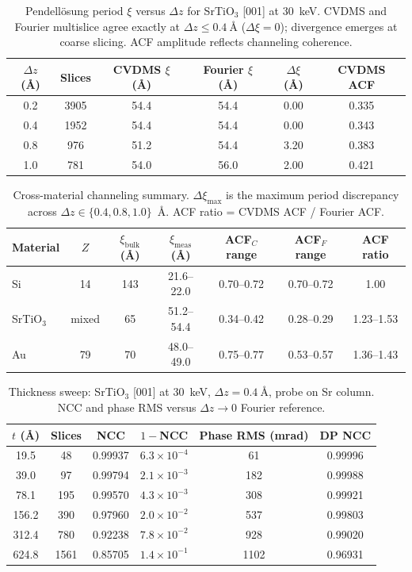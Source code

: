 \documentclass[twoside,11pt]{article}
\begin{document}
\begin{table}[H]
\centering
\caption{Pendell\"osung period $\xi$ versus $\Delta z$ for SrTiO$_3$ [001] at \SI{30}{\keV}. CVDMS and Fourier multislice agree exactly at $\Delta z\le\SI{0.4}{\angstrom}$ ($\Delta\xi=0$); divergence emerges at coarse slicing. ACF amplitude reflects channeling coherence.}
\label{tab:S2}
\small
\begin{tabular}{cccccc}
\toprule
$\Delta z$ (\AA) & Slices & CVDMS $\xi$ (\AA) & Fourier $\xi$ (\AA) & $\Delta\xi$ (\AA) & CVDMS ACF \\
\midrule
0.2 & 3905 & 54.4 & 54.4 & 0.00 & 0.335 \\
0.4 & 1952 & 54.4 & 54.4 & 0.00 & 0.343 \\
0.8 & 976  & 51.2 & 54.4 & 3.20 & 0.383 \\
1.0 & 781  & 54.0 & 56.0 & 2.00 & 0.421 \\
\bottomrule
\end{tabular}
\end{table}

\begin{table}[H]
\centering
\caption{Cross-material channeling summary. $\Delta\xi_\text{max}$ is the maximum period discrepancy across $\Delta z\in\{0.4,0.8,1.0\}$~\AA. ACF ratio = CVDMS ACF / Fourier ACF.}
\label{tab:S3}
\small
\begin{tabular}{lcccccc}
\toprule
Material & $Z$ & $\xi_\text{bulk}$ (\AA) & $\xi_\text{meas}$ (\AA) & ACF$_C$ range & ACF$_F$ range & ACF ratio \\
\midrule
Si & 14 & 143 & 21.6--22.0 & 0.70--0.72 & 0.70--0.72 & 1.00 \\
SrTiO$_3$ & mixed & 65 & 51.2--54.4 & 0.34--0.42 & 0.28--0.29 & 1.23--1.53 \\
Au & 79 & 70 & 48.0--49.0 & 0.75--0.77 & 0.53--0.57 & 1.36--1.43 \\
\bottomrule
\end{tabular}
\end{table}

\begin{table}[H]
\centering
\caption{Thickness sweep: SrTiO$_3$ [001] at \SI{30}{\keV}, $\Delta z=\SI{0.4}{\angstrom}$, probe on Sr column. NCC and phase RMS versus $\Delta z\to0$ Fourier reference.}
\label{tab:S4}
\small
\begin{tabular}{cccccc}
\toprule
$t$ (\AA) & Slices & NCC & $1-$NCC & Phase RMS (mrad) & DP NCC \\
\midrule
19.5 & 48   & 0.99937 & $6.3\times10^{-4}$ & 61  & 0.99996 \\
39.0 & 97   & 0.99794 & $2.1\times10^{-3}$ & 182 & 0.99988 \\
78.1 & 195  & 0.99570 & $4.3\times10^{-3}$ & 308 & 0.99921 \\
156.2 & 390 & 0.97960 & $2.0\times10^{-2}$ & 537 & 0.99803 \\
312.4 & 780 & 0.92238 & $7.8\times10^{-2}$ & 928 & 0.99020 \\
624.8 & 1561 & 0.85705 & $1.4\times10^{-1}$ & 1102 & 0.96931 \\
\bottomrule
\end{tabular}
\end{table}
\end{document}
